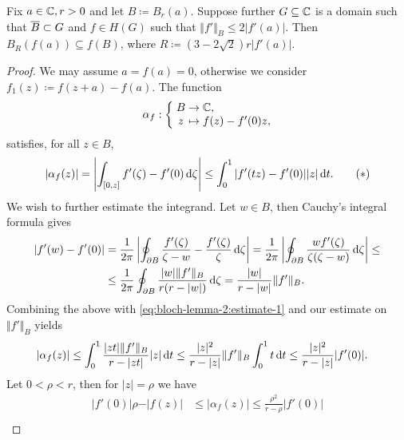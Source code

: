 \begin{lemma} \label{lem:bloch-lemma-2}
    Fix $a \in \mathbb{C}, r > 0$ and let $B \coloneqq B_{r}(a)$. Suppose further $G \subseteq \mathbb{C}$ is a domain such that $\overline{B} \subset G$ and $f \in H(G)$ such that $\Vert f' \Vert_B \leq 2 \vert f'(a) \vert$. Then $ B_{R}(f(a)) \subseteq f(B)$, where $ R \coloneqq (3 - 2 \sqrt{2}) r \vert f'(a) \vert $.
\end{lemma}

\begin{proof}
    We may assume $a = f(a) = 0$, otherwise we consider $f_1(z) \coloneqq f(z + a) - f(a)$. The function
    $$ \mapping{\alpha_f}{B & \to & \C,}{z & \mapsto & f(z) - f'(0) z,} $$
    satisfies, for all $z \in B$,
    \begin{equation} \label{eq:bloch-lemma-2:estimate-1}
        \vert \alpha_f(z) \vert = \left\vert \int_{[0, z]} f'(\zeta) - f'(0) \mathop{}\!\mathrm{d} \zeta \right\vert \leq \int_0^1 \vert f'(t z) - f'(0) \vert \vert z \vert \mathop{}\!\mathrm{d} t. \tag{\textasteriskcentered}
    \end{equation}
    We wish to further estimate the integrand. Let $w \in B$, then Cauchy's integral formula gives
    \begin{align*}
        \vert f'(w) - f'(0) \vert &= \frac{1}{2\pi} \left\vert \oint_{\partial B} \frac{f'(\zeta)}{\zeta - w} - \frac{f'(\zeta)}{\zeta} \mathop{}\!\mathrm{d} \zeta \right\vert = \frac{1}{2\pi} \left\vert \oint_{\partial B} \frac{w f'(\zeta)}{\zeta (\zeta - w)} \mathop{}\!\mathrm{d} \zeta \right\vert \leq \\
        &\leq \frac{1}{2\pi} \oint_{\partial B} \frac{\vert w \vert \Vert f' \Vert_B}{r(r - \vert w \vert)} \mathop{}\!\mathrm{d} \zeta = \frac{\vert w \vert}{r - \vert w \vert} \Vert f' \Vert_B.
    \end{align*}
    Combining the above with \eqref{eq:bloch-lemma-2:estimate-1} and our estimate on $\Vert f' \Vert_B$ yields
    \begin{align*}
        \vert \alpha_f(z) \vert &\leq \int_0^1 \frac{\vert z t \vert \Vert f' \Vert_B}{r - \vert z t \vert} \vert z \vert \mathop{}\!\mathrm{d} t \leq \frac{\vert z \vert^2}{r - \vert z \vert} \Vert f' \Vert_B \int_0^1 t \mathop{}\!\mathrm{d} t \leq \frac{\vert z \vert^2}{r - \vert z \vert} \vert f'(0) \vert.
    \end{align*}
    Let $0 < \rho < r$, then for $\vert z \vert = \rho$ we have
    \begin{align*}
        \vert f'(0) \vert \rho - \vert f(z) \vert &\leq \vert \alpha_f(z) \vert \leq \frac{\rho^2}{r - \rho} \vert f'(0) \vert \\

\end{align*}
\end{proof}
